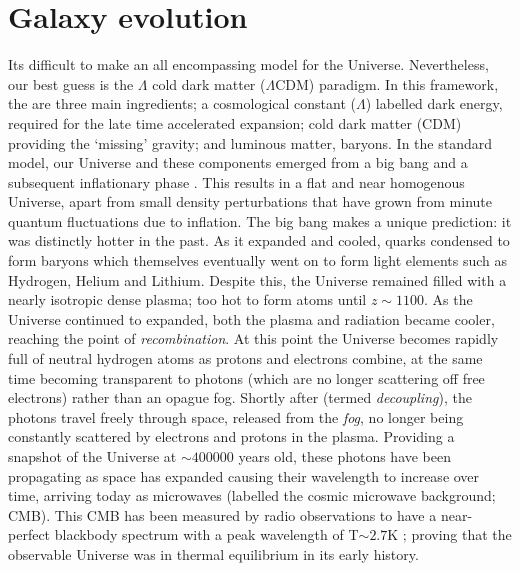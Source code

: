 \section{Galaxy evolution} \label{sec:gal_evo_intro}
Its difficult to make an all encompassing model for the Universe. Nevertheless, our best guess is the $\Lambda$ cold dark matter ($\Lambda$CDM) paradigm. In this framework, the are three main ingredients; a cosmological constant ($\Lambda$) labelled dark energy, required for the late time accelerated expansion; cold dark matter (CDM) providing the `missing' gravity; and luminous matter, baryons. In the standard model, our Universe and these components emerged from a big bang and a subsequent inflationary phase \citep[epoch of accelerated expansion;][]{guth1981}. This results in a flat and near homogenous Universe, apart from small density perturbations that have grown from minute quantum fluctuations due to inflation. The big bang makes a unique prediction: it was distinctly hotter in the past. As it expanded and cooled, quarks condensed to form baryons which themselves eventually went on to form light elements such as Hydrogen, Helium and Lithium. Despite this, the Universe remained filled with a nearly isotropic dense plasma; too hot to form atoms until $z \sim 1100$. As the Universe continued to expanded, both the plasma and radiation became cooler, reaching the point of \textit{recombination}. At this point the Universe becomes rapidly full of neutral hydrogen atoms as protons and electrons combine, at the same time becoming transparent to photons (which are no longer scattering off free electrons) rather than an opague fog. Shortly after (termed \textit{decoupling}), the photons travel freely through space, released from the \textit{fog}, no longer being constantly scattered by electrons and protons in the plasma. Providing a snapshot of the Universe at $\sim 400000$ years old, these photons have been propagating as space has expanded causing their wavelength to increase over time, arriving today as microwaves (labelled the cosmic microwave background; CMB). This CMB has been measured by radio observations to have a near-perfect blackbody spectrum with a peak wavelength of T$\sim 2.7$K \citep{planck2016xiii}; proving that the observable Universe was in thermal equilibrium in its early history.

